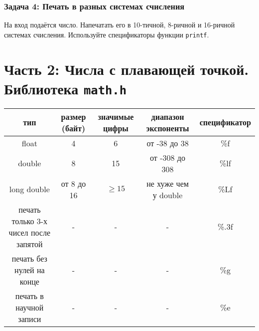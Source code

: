 \documentclass{article}
\begin{document}
\subsubsection*{Задача 4: Печать в разных системах счисления}
На вход подаётся число. Напечатать его в 10-тичной, 8-ричной и 16-ричной системах счисления. Используйте спецификаторы функции \texttt{printf}.

\newpage
\section*{Часть 2: Числа с плавающей точкой. Библиотека \texttt{math.h}}
\begin{center}
\begin{tabular}{ c c c c c }
 тип & размер (байт) & значимые цифры & диапазон экспоненты & спецификатор \\ \hline
 float             & 4          & 6  & от -38 до 38    & \%f \\ 
 double            & 8          & 15 & от -308 до 308  & \%lf  \\  
 long double       & от 8 до 16 & $\ge 15$  & не хуже чем у double  & \%Lf  \\ \hline
 печать только 3-х чисел после запятой & -          & -  & -              & \%.3f \\
 печать без нулей на конце & -          & -  & -              & \%g \\
 печать в научной записи   & -          & -  & -              & \%e \\
\end{tabular}
\end{center}
\end{document}
